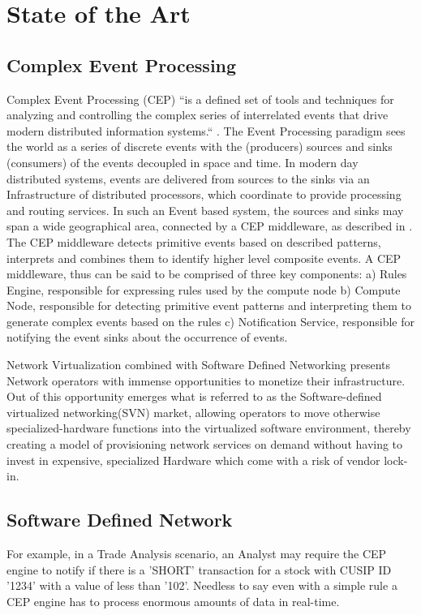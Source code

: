 \chapter{State of the Art} 
\section{Complex Event Processing}
Complex Event Processing (CEP) ``is a defined set of tools and techniques for analyzing and controlling the complex series of interrelated events that drive modern distributed information systems.`` \citep{NpForMasses}. The Event Processing paradigm sees the world as a series of discrete events with the (producers) sources and sinks (consumers) of the events decoupled in space and time. In modern day distributed systems, events are delivered from sources to the sinks via an Infrastructure of distributed processors, which coordinate to provide processing and routing services. In such an Event based system, the sources and sinks may span a wide geographical area, connected by a CEP middleware, as described in \cite{Cugola}. The CEP middleware detects primitive events based on described patterns, interprets and combines them to identify higher level composite events. A CEP middleware, thus can be said to be comprised of three key components: a) Rules Engine, responsible for expressing rules used by the compute node  b) Compute Node, responsible for detecting primitive event patterns and interpreting them to generate complex events based on the rules c) Notification Service, responsible for notifying the event sinks about the occurrence of events.

Network Virtualization combined with Software Defined Networking presents Network operators with immense opportunities to monetize their infrastructure. Out of this opportunity emerges what is referred to as the Software-defined virtualized networking(SVN) market, allowing operators to move otherwise specialized-hardware functions into the virtualized software environment, thereby creating a model of provisioning network services on demand without having to invest in expensive, specialized Hardware which come with a risk of vendor lock-in. \cite{PerAnalysisNFV}


 

\section{Software Defined Network}
For example, in a Trade Analysis scenario, an Analyst may require the CEP engine to notify if there is a 'SHORT' transaction for a stock with CUSIP ID '1234' with a value of less than '102'. Needless to say even with a simple rule a CEP engine has to process enormous amounts of data in real-time.

